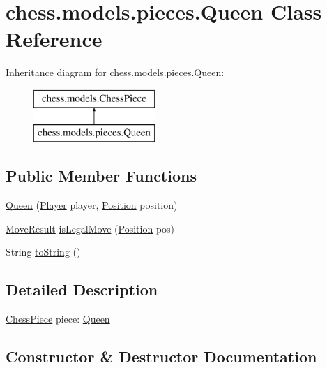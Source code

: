 \hypertarget{classchess_1_1models_1_1pieces_1_1_queen}{}\section{chess.\+models.\+pieces.\+Queen Class Reference}
\label{classchess_1_1models_1_1pieces_1_1_queen}
Inheritance diagram for chess.\+models.\+pieces.\+Queen\+:\begin{figure}[H]
\begin{center}
\leavevmode
\includegraphics[height=2.000000cm]{classchess_1_1models_1_1pieces_1_1_queen}
\end{center}
\end{figure}
\subsection*{Public Member Functions}
\begin{DoxyCompactItemize}
\item 
\mbox{\hyperlink{classchess_1_1models_1_1pieces_1_1_queen_acc127213b82632b23448f334512b34b8}{Queen}} (\mbox{\hyperlink{enumchess_1_1models_1_1enums_1_1_player}{Player}} player, \mbox{\hyperlink{classchess_1_1models_1_1_position}{Position}} position)
\item 
\mbox{\hyperlink{enumchess_1_1models_1_1enums_1_1_move_result}{Move\+Result}} \mbox{\hyperlink{classchess_1_1models_1_1pieces_1_1_queen_a99486b83609e973af4c09ddcf3582617}{is\+Legal\+Move}} (\mbox{\hyperlink{classchess_1_1models_1_1_position}{Position}} pos)
\item 
String \mbox{\hyperlink{classchess_1_1models_1_1pieces_1_1_queen_a723a09d8252bb14578d33c099242e37d}{to\+String}} ()
\end{DoxyCompactItemize}


\subsection{Detailed Description}
\mbox{\hyperlink{classchess_1_1models_1_1_chess_piece}{Chess\+Piece}} piece\+: \mbox{\hyperlink{classchess_1_1models_1_1pieces_1_1_queen}{Queen}} 

\subsection{Constructor \& Destructor Documentation}
\mbox{\label{classchess_1_1models_1_1pieces_1_1_queen_acc127213b82632b23448f334512b34b8}} 

